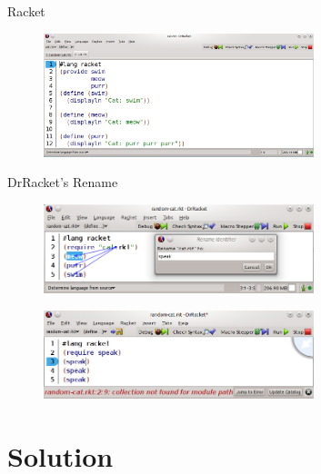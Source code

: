 \documentclass[xcolor=dvipsnames, 14pt]{beamer}
\begin{document}
\begin{frame}{Racket}
\begin{figure}[htbp]
  \centering
  \includegraphics[width=0.7\textwidth]{img/cat-definition.png}
  \label{fig:renameBefore}
\end{figure}
\end{frame}
\begin{frame}{DrRacket's Rename}
\begin{figure}[htbp]
  \centering
  \includegraphics[width=0.7\textwidth]{img/renameV3-4.png}
  \label{fig:renameBefore}
\end{figure}

\begin{figure}[htbp]
  \centering
  \includegraphics[width=0.7\textwidth]{img/rename-error.png}
  \label{fig:RacketBug}
\end{figure}
\end{frame}

\section{Solution}
\end{document}
